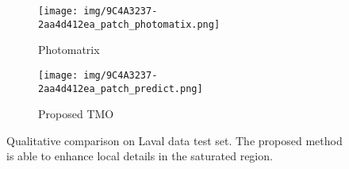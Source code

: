 \documentclass[journal]{IEEEtran}
\begin{document}
\begin{figure*}[t]
\begin{subfigure}[b]{0.24\textwidth}
        \end{subfigure}
        \begin{subfigure}[b]{0.24\textwidth}   
            \centering 
            \texttt{[image: img/9C4A3237-2aa4d412ea\_patch\_photomatix.png]}
            \caption[]%
            {{\small Photomatrix \cite{photomatrix} }}    
            \label{fig:mean and std of net34}
        \end{subfigure}
        \begin{subfigure}[b]{0.24\textwidth}   
            \centering 
            \texttt{[image: img/9C4A3237-2aa4d412ea\_patch\_predict.png]}
            \caption[]%
            {{\small Proposed TMO}}    
            \label{fig:mean and std of net44}
        \end{subfigure}
        \caption{Qualitative comparison on Laval data test set. The proposed method is able to enhance local details in the saturated region.}
        \label{fig:Laval_9C4A3237-2aa4d412ea}
\end{figure*} 
\end{document}
